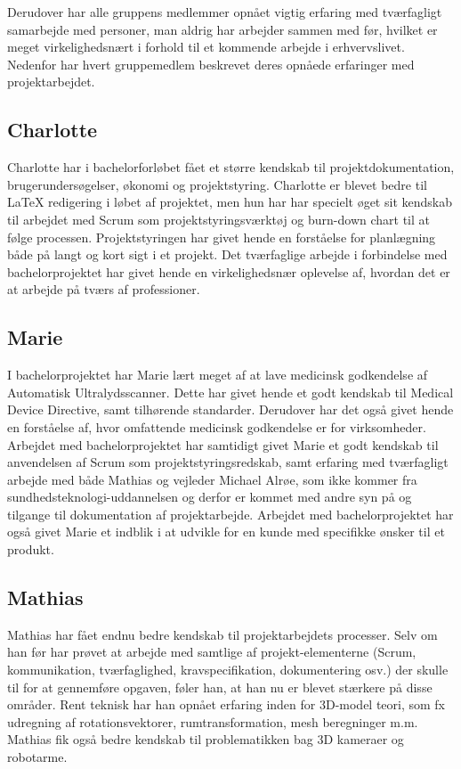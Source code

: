 Derudover har alle gruppens medlemmer opnået vigtig erfaring med tværfagligt samarbejde med personer, man aldrig har arbejder sammen med før, hvilket er meget virkelighedsnært i forhold til et kommende arbejde i erhvervslivet.
Nedenfor har hvert gruppemedlem beskrevet deres opnåede erfaringer med projektarbejdet. 

\subsection{Charlotte}
Charlotte har i bachelorforløbet fået et større kendskab til projektdokumentation, brugerundersøgelser, økonomi og projektstyring. Charlotte er blevet bedre til LaTeX redigering i løbet af projektet, men hun har har specielt øget sit kendskab til arbejdet med Scrum som projektstyringsværktøj og burn-down chart til at følge processen. Projektstyringen har givet hende en forståelse for planlægning både på langt og kort sigt i et projekt. Det tværfaglige arbejde i forbindelse med bachelorprojektet har givet hende en virkelighedsnær oplevelse af, hvordan det er at arbejde på tværs af professioner. 

\subsection{Marie}
I bachelorprojektet har Marie lært meget af at lave medicinsk godkendelse af Automatisk Ultralydsscanner. Dette har givet hende et godt kendskab til Medical Device Directive, samt tilhørende standarder. Derudover har det også givet hende en forståelse af, hvor omfattende medicinsk godkendelse er for virksomheder. Arbejdet med bachelorprojektet har samtidigt givet Marie et godt kendskab til anvendelsen af Scrum som projektstyringsredskab, samt erfaring med tværfagligt arbejde med både Mathias og vejleder Michael Alrøe, som ikke kommer fra sundhedsteknologi-uddannelsen og derfor er kommet med andre syn på og tilgange til dokumentation af projektarbejde. Arbejdet med bachelorprojektet har også givet Marie et indblik i at udvikle for en kunde med specifikke ønsker til et produkt. 

\subsection{Mathias}
Mathias har fået endnu bedre kendskab til projektarbejdets processer. Selv om han før har prøvet at arbejde med samtlige af projekt-elementerne (Scrum, kommunikation, tværfaglighed, kravspecifikation, dokumentering osv.) der skulle til for at gennemføre opgaven, føler han, at han nu er blevet stærkere på disse områder. Rent teknisk har han opnået erfaring inden for 3D-model teori, som fx udregning af rotationsvektorer, rumtransformation, mesh beregninger m.m. Mathias fik også bedre kendskab til problematikken bag 3D kameraer og robotarme.


